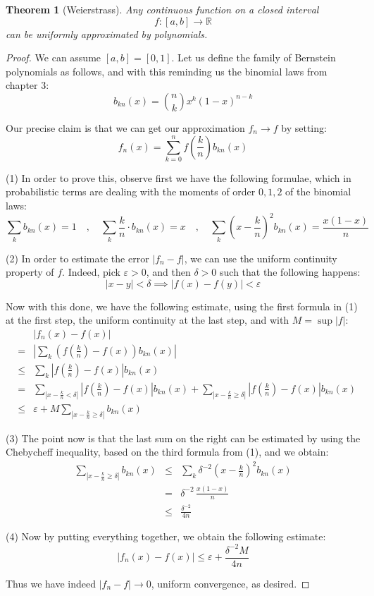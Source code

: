 \documentclass[12pt]{amsbook}
\newtheorem{theorem}{Theorem}[chapter]
\begin{document}
\begin{theorem}[Weierstrass]
Any continuous function on a closed interval
$$f:[a,b]\to\mathbb R$$
can be uniformly approximated by polynomials.
\end{theorem}

\begin{proof}
We can assume $[a,b]=[0,1]$. Let us define the family of Bernstein polynomials as follows, and with this reminding us the binomial laws from chapter 3:
$$b_{kn}(x)=\binom{n}{k}x^k(1-x)^{n-k}$$

Our precise claim is that we can get our approximation $f_n\to f$ by setting:
$$f_n(x)=\sum_{k=0}^nf\left(\frac{k}{n}\right)b_{kn}(x)$$

(1) In order to prove this, observe first we have the following formulae, which in probabilistic terms are dealing with the moments of order $0,1,2$ of the binomial laws:
$$\sum_kb_{kn}(x)=1\quad,\quad 
\sum_k\frac{k}{n}\cdot b_{kn}(x)=x\quad,\quad 
\sum_k\left(x-\frac{k}{n}\right)^2b_{kn}(x)=\frac{x(1-x)}{n}$$

(2) In order to estimate the error $|f_n-f|$, we can use the uniform continuity property of $f$. Indeed, pick $\varepsilon>0$, and then $\delta>0$ such that the following happens:
$$|x-y|<\delta\implies|f(x)-f(y)|<\varepsilon$$

Now with this done, we have the following estimate, using the first formula in (1) at the first step, the uniform continuity at the last step, and with $M=\sup|f|$:
\begin{eqnarray*}
&&|f_n(x)-f(x)|\\
&=&\left|\sum_k\left(f\left(\frac{k}{n}\right)-f(x)\right)b_{kn}(x)\right|\\
&\leq&\sum_k\left|f\left(\frac{k}{n}\right)-f(x)\right|b_{kn}(x)\\
&=&\sum_{\left|x-\frac{k}{n}<\delta\right|}\left|f\left(\frac{k}{n}\right)-f(x)\right|b_{kn}(x)
+\sum_{\left|x-\frac{k}{n}\geq\delta\right|}\left|f\left(\frac{k}{n}\right)-f(x)\right|b_{kn}(x)\\
&\leq&\varepsilon+M\sum_{\left|x-\frac{k}{n}\geq\delta\right|}b_{kn}(x)
\end{eqnarray*}

(3) The point now is that the last sum on the right can be estimated by using the Chebycheff inequality, based on the third formula from (1), and we obtain:
\begin{eqnarray*}
\sum_{\left|x-\frac{k}{n}\geq\delta\right|}b_{kn}(x)
&\leq&\sum_k\delta^{-2}\left(x-\frac{k}{n}\right)^2b_{kn}(x)\\
&=&\delta^{-2}\,\frac{x(1-x)}{n}\\
&\leq&\frac{\delta^{-2}}{4n}
\end{eqnarray*}

(4) Now by putting everything together, we obtain the following estimate:
$$|f_n(x)-f(x)|\leq \varepsilon+\frac{\delta^{-2}M}{4n}$$

Thus we have indeed $|f_n-f|\to0$, uniform convergence, as desired.
\end{proof}
\end{document}
